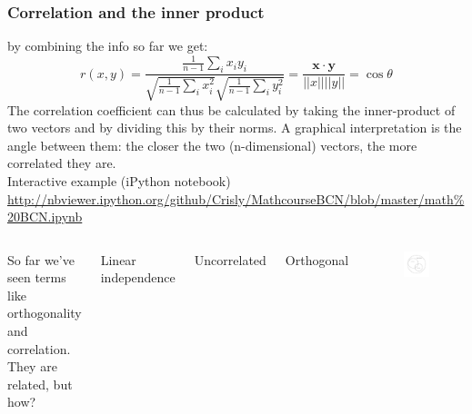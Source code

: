 \documentclass{beamer}
\begin{document}
\begin{frame}
\frametitle{Correlation and the inner product}
by  combining the info so far we get:
$$r(x,y) = \frac{ \frac{1}{n-1}\sum_i x_i y_i}
{\sqrt{\frac{1}{n-1}\sum_i x_i^2} \sqrt{\frac{1}{n-1}\sum_i y_i^2}} = \frac{\mathbf{x} \cdot  \mathbf{y} } {||x|| ||y||} = \cos{\theta}$$
The correlation coefficient can thus be calculated by taking the inner-product of two vectors and by dividing this by their norms. A graphical interpretation is the angle between them: the closer the two (n-dimensional) vectors, the more correlated they are.\\
Interactive example (iPython notebook)
\url{http://nbviewer.ipython.org/github/Crisly/MathcourseBCN/blob/master/math\%20BCN.ipynb}
\end{frame}

\begin{frame}
\begin{columns}[c]
So far we've seen terms like orthogonality and correlation. They are related, but how?
\begin{block}{}
Linear independence
\end{block}

\begin{block}{}
Uncorrelated
\end{block}

\begin{block}{}
Orthogonal
\end{block}
\begin{figure}[t]
\begin{center}
 \includegraphics[width=1.3\textwidth]{relation_venn_stats_a}
\caption{}
\end{center}
\end{figure}
\end{columns}
\end{frame}
\end{document}
